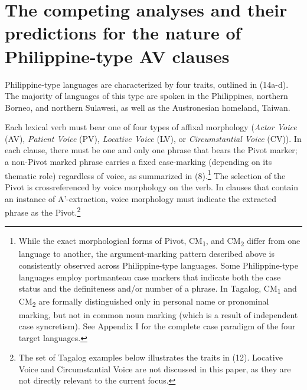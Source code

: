 \documentclass[10pt]{article}
\begin{document}
\section{The competing analyses and their predictions for the nature of Philippine-type AV clauses}

\noindent
 Philippine-type languages are characterized by four traits, outlined in (14a-d). The majority of languages of this type are spoken in the Philippines, northern Borneo, and northern Sulawesi, as well as the Austronesian homeland, Taiwan.


\begin{exe}
\ex 
    \begin{xlist}
\ex Each lexical verb must bear one of four types of affixal morphology (\textit{Actor Voice} (AV), \textit{Patient Voice} (PV), \textit{Locative Voice} (LV), or \textit{Circumstantial Voice} (CV)).
\ex In each clause, there must be one and only one phrase that bears the Pivot marker; a non-Pivot marked phrase carries a fixed case-marking (depending on its thematic role) regardless of voice, as summarized in (8).\footnote{While the exact morphological forms of Pivot, CM\textsubscript{1}, and CM\textsubscript{2} differ from one language to another, the argument-marking pattern described above is consistently observed across Philippine-type languages. Some Philippine-type languages employ portmanteau case markers that indicate both the case status and the definiteness and/or number of a phrase. In Tagalog, CM\textsubscript{1} and CM\textsubscript{2} are formally distinguished only in personal name or pronominal marking, but not in common noun marking (which is a result of independent case syncretism). See Appendix I for the complete case paradigm of the four target languages. }
\ex The selection of the Pivot is crossreferenced by voice morphology on the verb.
\ex In clauses that contain an instance of A'-extraction, voice morphology must indicate the extracted phrase as the Pivot.\footnote{The set of Tagalog examples below illustrates the traits in (12). Locative Voice and Circumstantial Voice are not discussed in this paper, as they are not directly relevant to the current focus.

}
\end{xlist}
\end{exe}
\end{document}
